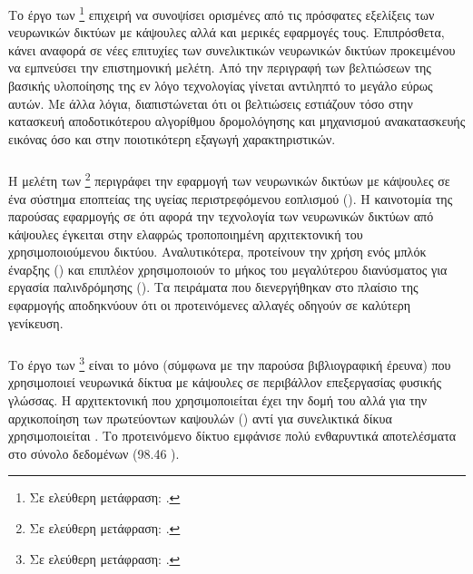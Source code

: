 \subsubsection{}

Το έργο των  \footnote{Σε ελεύθερη μετάφραση: .} \cite{pande2018analysis} επιχειρή να συνοψίσει ορισμένες από τις πρόσφατες εξελίξεις των νευρωνικών δικτύων με κάψουλες αλλά και μερικές εφαρμογές τους. Επιπρόσθετα, κάνει αναφορά σε νέες επιτυχίες των συνελικτικών νευρωνικών δικτύων προκειμένου να εμπνεύσει την επιστημονική μελέτη. Από την περιγραφή των βελτιώσεων της βασικής υλοποίησης της εν λόγο τεχνολογίας γίνεται αντιληπτό το μεγάλο εύρως αυτών. Με άλλα λόγια, διαπιστώνεται ότι οι βελτιώσεις εστιάζουν τόσο στην κατασκευή αποδοτικότερου αλγορίθμου δρομολόγησης και μηχανισμού ανακατασκευής εικόνας όσο και στην ποιοτικότερη εξαγωγή χαρακτηριστικών. 


\subsubsection{}

Η μελέτη των  \footnote{Σε ελεύθερη μετάφραση: .} \cite{zhu2019convolutional} περιγράφει την εφαρμογή των νευρωνικών δικτύων με κάψουλες σε ένα σύστημα εποπτείας της υγείας περιστρεφόμενου εοπλισμού (). Η καινοτομία της παρούσας εφαρμογής σε ότι αφορά την τεχνολογία των νευρωνικών δικτύων από κάψουλες έγκειται στην ελαφρώς τροποποιημένη αρχιτεκτονική του χρησιμοποιούμενου δικτύου. Αναλυτικότερα, προτείνουν την χρήση ενός μπλόκ έναρξης () και επιπλέον χρησιμοποιούν το μήκος του μεγαλύτερου διανύσματος για εργασία παλινδρόμησης (). Τα πειράματα που διενεργήθηκαν στο πλαίσιο της εφαρμογής αποδηκνύουν ότι οι προτεινόμενες αλλαγές οδηγούν σε καλύτερη γενίκευση.


\subsubsection{}

Το έργο των  \footnote{Σε ελεύθερη μετάφραση: .} \cite{srivastava2018identifying} είναι το μόνο (σύμφωνα με την παρούσα βιβλιογραφική έρευνα) που χρησιμοποιεί νευρωνικά δίκτυα με κάψουλες σε περιβάλλον επεξεργασίας φυσικής γλώσσας. Η αρχιτεκτονική που χρησιμοποιείται έχει την δομή του \cite{sabour2017dynamic} αλλά για την αρχικοποίηση των πρωτεύοντων καψουλών () αντί για συνελικτικά δίκυα χρησιμοποιείται . Το προτεινόμενο δίκτυο εμφάνισε πολύ ενθαρυντικά αποτελέσματα στο σύνολο δεδομένων  (98.46 ).
